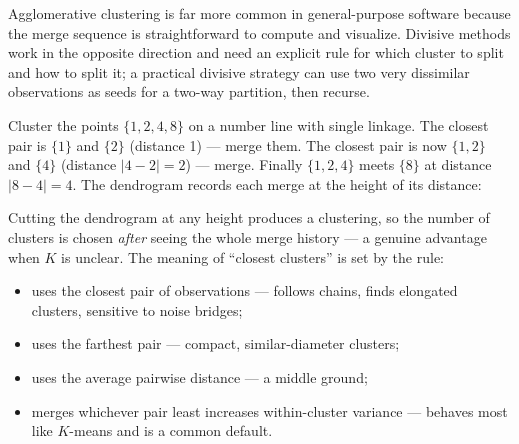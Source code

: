 Agglomerative clustering is far more common in general-purpose software because the merge sequence is straightforward to compute and visualize. Divisive methods work in the opposite direction and need an explicit rule for which cluster to split and how to split it; a practical divisive strategy can use two very dissimilar observations as seeds for a two-way partition, then recurse.

\begin{workedexample}
Cluster the points $\{1,2,4,8\}$ on a number line with single linkage. The closest pair is $\{1\}$ and $\{2\}$ (distance 1) --- merge them. The closest pair is now $\{1,2\}$ and $\{4\}$ (distance $|4-2|=2$) --- merge. Finally $\{1,2,4\}$ meets $\{8\}$ at distance $|8-4|=4$. The dendrogram records each merge at the height of its distance:
\end{workedexample}

\begin{mlfigure}
\end{mlfigure}

Cutting the dendrogram at any height produces a clustering, so the number of clusters is chosen \emph{after} seeing the whole merge history --- a genuine advantage when $K$ is unclear. The meaning of ``closest clusters'' is set by the  rule:

\begin{itemize}
  \item {} uses the closest pair of observations --- follows chains, finds elongated clusters, sensitive to noise bridges;
  \item {} uses the farthest pair --- compact, similar-diameter clusters;
  \item {} uses the average pairwise distance --- a middle ground;
  \item {} merges whichever pair least increases within-cluster variance --- behaves most like $K$-means and is a common default.
\end{itemize}

